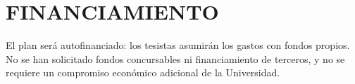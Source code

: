\documentclass[11pt,a4paper,oneside]{report}
\newcommand{\tesisbodyfont}{\fontsize{11}{13.6}\selectfont}
\begin{document}
\section{FINANCIAMIENTO}
\label{sec:financiamiento}

El plan será autofinanciado: los tesistas asumirán los gastos con fondos propios. No se han solicitado fondos concursables ni financiamiento de terceros, y no se requiere un compromiso económico adicional de la Universidad.

\begin{singlespace}
\tesisbodyfont
\printbibliography[heading=bibintoc,title={REFERENCIAS}]
\end{singlespace}

\renewcommand{\thetable}{A.\arabic{table}}
\renewcommand{\thefigure}{A.\arabic{figure}}
\renewcommand{\theHtable}{anexo.\arabic{table}}
\renewcommand{\theHfigure}{anexo.\arabic{figure}}
\renewcommand{\theHsection}{anexo.\arabic{section}}
\setcounter{table}{0}
\setcounter{figure}{0}
\setcounter{section}{0}
\end{document}
